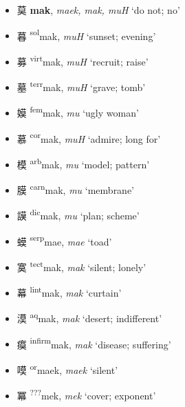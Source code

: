 \begin{itemize}
  \item {\Large{莫}} %
    {\large{\textbf{mak}}},
    \textit{maek, mak, muH} `do not; no' %

  \item {\Large{暮}} %
    {\large{{\textsuperscript{sol}}mak}},
    \textit{muH} `sunset; evening' %

  \item {\Large{募}} %
    {\large{{\textsuperscript{virt}}mak}},
    \textit{muH} `recruit; raise' %

  \item {\Large{墓}} %
    {\large{{\textsuperscript{terr}}mak}},
    \textit{muH} `grave; tomb' %

  \item {\Large{嫫}} %
    {\large{{\textsuperscript{fem}}mak}},
    \textit{mu} `ugly woman' %

  \item {\Large{慕}} %
    {\large{{\textsuperscript{cor}}mak}},
    \textit{muH} `admire; long for' %

  \item {\Large{模}} %
    {\large{{\textsuperscript{arb}}mak}},
    \textit{mu} `model; pattern' %

  \item {\Large{膜}} %
    {\large{{\textsuperscript{carn}}mak}},
    \textit{mu} `membrane' %

  \item {\Large{謨}} %
    {\large{{\textsuperscript{dic}}mak}},
    \textit{mu} `plan; scheme' %

  \item {\Large{蟆}} %
    {\large{{\textsuperscript{serp}}mae}},
    \textit{mae} `toad' %

  \item {\Large{寞}} %
    {\large{{\textsuperscript{tect}}mak}},
    \textit{mak} `silent; lonely' %

  \item {\Large{幕}} %
    {\large{{\textsuperscript{lint}}mak}},
    \textit{mak} `curtain' %

  \item {\Large{漠}} %
    {\large{{\textsuperscript{aq}}mak}},
    \textit{mak} `desert; indifferent' %

  \item {\Large{瘼}} %
    {\large{{\textsuperscript{infirm}}mak}},
    \textit{mak} `disease; suffering' %

  \item {\Large{嗼}} %
    {\large{{\textsuperscript{or}}maek}},
    \textit{maek} `silent' %

  \item {\Large{冪}} %
    {\large{{\textsuperscript{???}}mek}},
    \textit{mek} `cover; exponent' %
\end{itemize}


